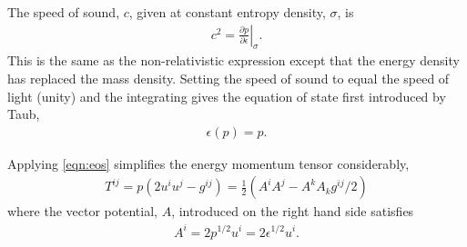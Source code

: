 \documentclass[10pt, fleqn,final,showtrims,oldfontcommands]{article} %
\newcommand{\eqal}[2]{\begin{align}#1\label{eqn:#2}\end{align}}
\newcommand{\eqnref}[1]{\ref{eqn:#1}}
\newcommand{\epsillon}{\epsilon}
\newcommand{\lr}[1]{\left( #1 \right)}
\renewcommand{\d}{\partial}
\newcommand{\given}[2]{ \left.{#1}\right|_{#2}  }
\newcommand{\half}{\tfrac{1}{2}}
\begin{document}
The speed of sound, $c$,  given at constant entropy density, $\sigma$, is\cite{LandauBook,Taub1978} 
\begin{align}
  c^2 = \given{\frac{\d p}{\d \epsillon}}{\sigma}. \label{eqn:soundspeed}
\end{align}
This is the same as the non-relativistic expression except that the energy density has replaced the mass density.
Setting the speed of sound to equal the speed of light (unity) and the integrating 
 gives
 the equation of state first introduced by Taub\cite{Taub1978},
\eqal{
  \epsilon(p) = p.
}{eos}




Applying \eqnref{eos} simplifies the energy momentum tensor considerably,
\eqal{
  T^{i j}  = p\lr{2 u^i u^j - g^{i j}} = \half \lr{ A^i A^j - A^k A_k g^{i j}/2} 
}{EMFluid}
where the vector potential, $A$, introduced on the right hand side satisfies
\eqal{
  A^i = 2p^{1/2}u^i =2 \epsilon^{1/2} u^i.
}{defnA}
\end{document}
